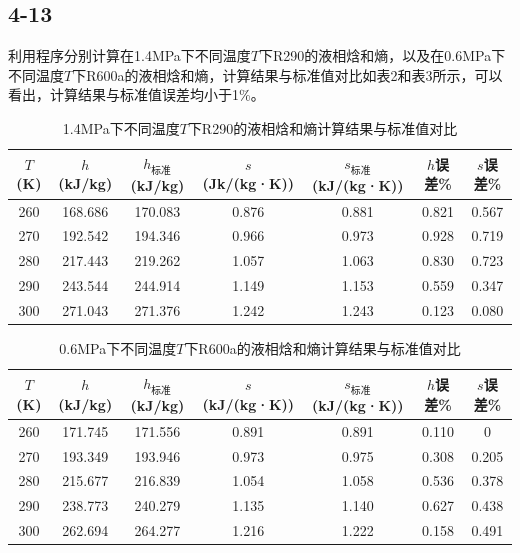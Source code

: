 \documentclass[12pt,a4paper]{article}
\begin{document}
\subsection*{4-13}

利用程序分别计算在1.4MPa下不同温度$T$下R290的液相焓和熵，以及在0.6MPa下不同温度$T$下R600a的液相焓和熵，计算结果与标准值对比如表2和表3所示，可以看出，计算结果与标准值误差均小于1\%。

\begin{table}[h]
\centering
\caption{1.4MPa下不同温度$T$下R290的液相焓和熵计算结果与标准值对比}
\begin{tabular}{c c c c c c c}
\hline
$T$ (K) & $h$ (kJ/kg) &$h_\mathrm{标准}$(kJ/kg) & $s$ (Jk/(kg·K)) &$s_\mathrm{标准}$(kJ/(kg·K))& $h$误差\%&$s$误差\%\\
\hline
260 & 168.686& 170.083& 0.876& 0.881& 0.821& 0.567\\
270 & 192.542& 194.346& 0.966& 0.973& 0.928& 0.719\\
280 & 217.443& 219.262& 1.057& 1.063& 0.830& 0.723\\
290 & 243.544& 244.914& 1.149& 1.153& 0.559& 0.347\\
300 & 271.043& 271.376& 1.242& 1.243& 0.123& 0.080\\
\hline
\end{tabular}
\end{table}

\begin{table}[h]
\centering
\caption{0.6MPa下不同温度$T$下R600a的液相焓和熵计算结果与标准值对比}
\begin{tabular}{c c c c c c c}
\hline
$T$ (K) & $h$ (kJ/kg) &$h_\mathrm{标准}$(kJ/kg) & $s$ (kJ/(kg·K)) &$s_\mathrm{标准}$(kJ/(kg·K))& $h$误差\%&$s$误差\%\\
\hline
260 & 171.745& 171.556& 0.891& 0.891& 0.110& 0\\
270 & 193.349& 193.946& 0.973& 0.975& 0.308& 0.205\\
280 & 215.677& 216.839& 1.054& 1.058& 0.536& 0.378\\
290 & 238.773& 240.279& 1.135& 1.140& 0.627& 0.438\\
300 & 262.694& 264.277& 1.216& 1.222& 0.158& 0.491\\
\hline
\end{tabular}
\end{table}
\end{document}

